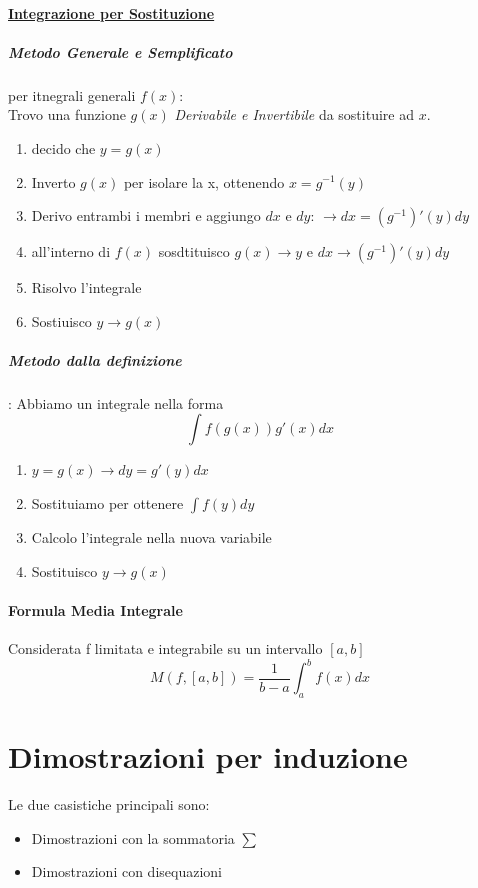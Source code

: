 \documentclass[12pt, a4paper]{article}
\begin{document}
	\paragraph*{\underline{Integrazione per Sostituzione}}
	\subparagraph*{\emph{Metodo Generale e Semplificato}} per itnegrali generali $f(x)$:
	\\Trovo una funzione $g(x)$ \emph{Derivabile e Invertibile} da sostituire ad $x$.
	\begin{enumerate}
		\item decido che $y=g(x)$
		\item Inverto $g(x)$ per isolare la x, ottenendo $x=g^{-1}(y)$
		\item Derivo entrambi i membri e aggiungo $dx$ e $dy$: $\to dx=(g^{-1})'(y)dy$
		\item all'interno di $f(x)$ sosdtituisco $g(x) \to y$ e $dx \to (g^{-1})'(y)dy$
		\item Risolvo l'integrale
		\item Sostiuisco $y \to g(x)$
	\end{enumerate}
	\subparagraph*{Metodo dalla definizione}: Abbiamo un integrale nella forma
	$$\int f(g(x))g'(x) dx$$
	\begin{enumerate}
		\item $y=g(x)\to dy=g'(y)dx$
		\item Sostituiamo per ottenere $\int f(y)dy$
		\item Calcolo l'integrale nella nuova variabile
		\item Sostituisco $y\to g(x)$
	\end{enumerate}

	\paragraph*{Formula Media Integrale}
	Considerata f limitata e integrabile su un intervallo $[a,b]$
	\begin{equation*}
		M(f,[a,b])=\frac{1}{b-a}\int_a^b f(x)dx
	\end{equation*}

	\section*{Dimostrazioni per induzione}
	Le due casistiche principali sono:
	\begin{itemize}
		\item Dimostrazioni con la sommatoria $\sum$
		\item Dimostrazioni con disequazioni
	\end{itemize}
\end{document}
